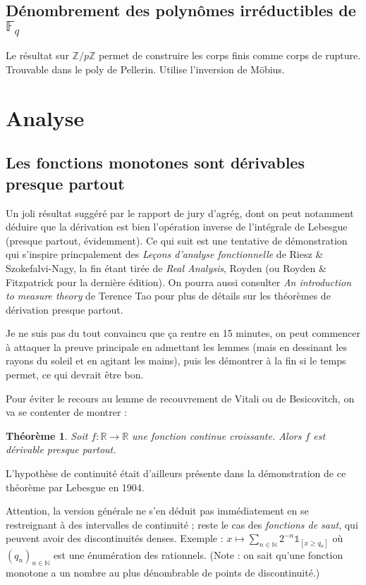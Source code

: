 \documentclass[a4paper, 11pt]{article}
\def\F{\mathbb{F}}
\def\Z{\mathbb{Z}}
\def\N{\mathbb{N}}
\def\R{\mathbb{R}}
\def\Indic{\mathbb{1}}
\newtheorem*{theorem}{Théorème}
\begin{document}
\subsection{Dénombrement des polynômes irréductibles de $\F_q$}

Le résultat sur $\Z/p\Z$ permet de construire les corps finis comme corps de
rupture. Trouvable dans le poly de Pellerin. Utilise l'inversion de Möbius.

\section{Analyse}

\subsection{Les fonctions monotones sont dérivables presque partout}

Un joli résultat suggéré par le rapport de jury d'agrég, dont on peut notamment
déduire que la dérivation est bien l'opération inverse de l'intégrale de
Lebesgue (presque partout, évidemment). Ce qui suit est une tentative de
démonstration qui s'inspire princpalement des \emph{Leçons d'analyse
  fonctionnelle} de Riesz \& Szokefalvi-Nagy, la fin étant tirée de \emph{Real
  Analysis}, Royden (ou Royden \& Fitzpatrick pour la dernière édition). On
pourra aussi consulter \emph{An introduction to measure theory} de Terence Tao
pour plus de détails sur les théorèmes de dérivation presque partout.

Je ne suis pas du tout convaincu que ça rentre en 15 minutes, on peut commencer
à attaquer la preuve principale en admettant les lemmes (mais en dessinant les
rayons du soleil et en agitant les mains), puis les démontrer à la fin si le
temps permet, ce qui devrait être bon.

Pour éviter le recours au lemme de recouvrement de Vitali ou de Besicovitch, on
va se contenter de montrer :
\begin{theorem}
  Soit $f : \R \to \R$ une fonction \textnormal{continue} croissante. Alors $f$ est
  dérivable presque partout.
\end{theorem}
L'hypothèse de continuité était d'ailleurs présente dans la démonstration de ce
théorème par Lebesgue en 1904.

Attention, la version générale ne s'en déduit pas immédiatement en se
restreignant à des intervalles de continuité ; reste le cas des \emph{fonctions
  de saut}, qui peuvent avoir des discontinuités denses. Exemple : $x \mapsto
\sum_{n \in \N} 2^{-n} \Indic_{[x \geq q_n]}$ où $(q_n)_{n \in \N}$ est une
énumération des rationnels. (Note : on sait qu'une fonction monotone a un nombre
au plus dénombrable de points de discontinuité.)
\end{document}
